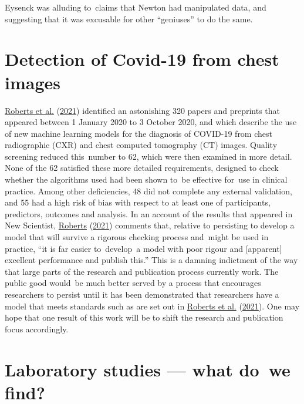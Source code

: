 \documentclass[
  10pt,
  b5paper]{book}
\begin{document}
Eysenck was alluding to~claims that Newton had manipulated data, and
suggesting that it was excusable for other ``geniuses'' to do the same.

\hypertarget{detection-of-covid-19-from-chest-images}{%
\section{Detection of Covid-19 from chest images}\label{detection-of-covid-19-from-chest-images}}

\protect\hyperlink{ref-roberts2021common}{Roberts et al.} (\protect\hyperlink{ref-roberts2021common}{2021}) identified an astonishing 320 papers and preprints
that appeared between 1 January 2020 to 3 October 2020, and which
describe the use of new machine learning models for the diagnosis of
COVID-19 from chest radiographic (CXR) and chest computed tomography
(CT) images. Quality screening reduced this~number to 62, which were
then examined in more detail. None of the 62 satisfied these more
detailed requirements, designed to check whether the algorithms used
had been shown to~be effective for~use in clinical practice. Among
other deficiencies, 48 did not complete any external validation, and
55 had a high risk of bias with respect to at least one of
participants, predictors, outcomes and analysis. In an account
of the results that appeared in New Scientist, \protect\hyperlink{ref-roberts2021machine}{Roberts} (\protect\hyperlink{ref-roberts2021machine}{2021})
comments that, relative
to persisting to develop a model that will survive a rigorous
checking process and~might be used in practice, ``it is far easier
to~develop~a model with poor rigour and {[}apparent{]} excellent
performance and publish this.'' This is a damning indictment of
the way that large parts of the research and publication process
currently work. The public good would~be much better served
by a process that encourages researchers to persist until it
has been demonstrated that researchers have a model that meets
standards such as are set out in \protect\hyperlink{ref-roberts2021common}{Roberts et al.} (\protect\hyperlink{ref-roberts2021common}{2021}). One may
hope that one result of this work will be to shift the research
and publication focus accordingly.

\hypertarget{laboratory-studies-what-do-we-find}{%
\section{Laboratory studies --- what do~we find?}\label{laboratory-studies-what-do-we-find}}
\end{document}
